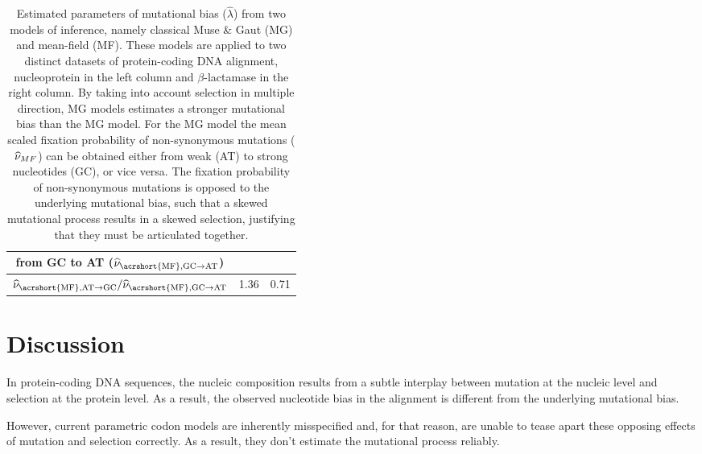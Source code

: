 \begin{table}[h]
{\begin{tabu}{|c||c|c|}
        \textbf{from GC to AT ($\widehat{\avgpfix}_{\text{\acrshort{MF}},\GCtoAT}$)} & & \\
        \hline \textbf{$\widehat{\avgpfix}_{\text{\acrshort{MF}},\ATtoGC} / \widehat{\avgpfix}_{\text{\acrshort{MF}},\GCtoAT}$ } & 1.36 & 0.71 \\
        \hline
    \end{tabu}}
    \caption[Estimated parameters]{
    Estimated parameters of mutational bias ($\widehat{\lambda}$) from two models of inference, namely classical Muse \& Gaut (\acrshort{MG}) and mean-field (\acrshort{MF}).
    These models are applied to two distinct datasets of protein-coding \acrshort{DNA} alignment, nucleoprotein in the left column and $\beta$-lactamase in the right column.
    By taking into account selection in multiple direction, \acrshort{MG} models estimates a stronger mutational bias than the \acrshort{MG} model.
    For the \acrshort{MG} model the mean scaled fixation probability of \gls{non-synonymous} mutations ($\widehat{\nu}_{MF}$) can be obtained either from weak (AT) to strong nucleotides (GC), or vice versa.
    The fixation probability of \gls{non-synonymous} mutations is opposed to the underlying mutational bias, such that a skewed mutational process results in a skewed selection, justifying that they must be articulated together.
    }
    \label{tab:mut-bias-estimation}
\end{table}


\section{Discussion}\label{sec:discussion}

In protein-coding \acrshort{DNA} sequences, the nucleic composition results from a subtle interplay between mutation at the nucleic level and selection at the protein level.
As a result, the observed nucleotide bias in the alignment is different from the underlying mutational bias.

However, current parametric \gls{codon} models are inherently misspecified and, for that reason, are unable to tease apart these opposing effects of mutation and selection correctly.
As a result, they don’t estimate the mutational process reliably.

